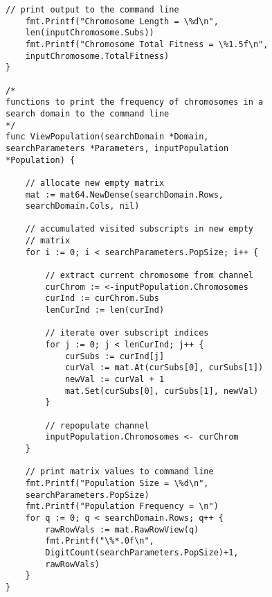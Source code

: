 \begin{lstlisting}[basicstyle=\small]
	// print output to the command line
	fmt.Printf("Chromosome Length = \%d\n", 
	len(inputChromosome.Subs))
	fmt.Printf("Chromosome Total Fitness = \%1.5f\n", 
	inputChromosome.TotalFitness)
}

/*
functions to print the frequency of chromosomes in a 
search domain to the command line
*/
func ViewPopulation(searchDomain *Domain, 
searchParameters *Parameters, inputPopulation 
*Population) {

	// allocate new empty matrix
	mat := mat64.NewDense(searchDomain.Rows, 
	searchDomain.Cols, nil)

	// accumulated visited subscripts in new empty 
	// matrix
	for i := 0; i < searchParameters.PopSize; i++ {

		// extract current chromosome from channel
		curChrom := <-inputPopulation.Chromosomes
		curInd := curChrom.Subs
		lenCurInd := len(curInd)

		// iterate over subscript indices
		for j := 0; j < lenCurInd; j++ {
			curSubs := curInd[j]
			curVal := mat.At(curSubs[0], curSubs[1])
			newVal := curVal + 1
			mat.Set(curSubs[0], curSubs[1], newVal)
		}

		// repopulate channel
		inputPopulation.Chromosomes <- curChrom
	}

	// print matrix values to command line
	fmt.Printf("Population Size = \%d\n", 
	searchParameters.PopSize)
	fmt.Printf("Population Frequency = \n")
	for q := 0; q < searchDomain.Rows; q++ {
		rawRowVals := mat.RawRowView(q)
		fmt.Printf("\%*.0f\n", 
		DigitCount(searchParameters.PopSize)+1, 
		rawRowVals)
	}
}

\end{lstlisting}